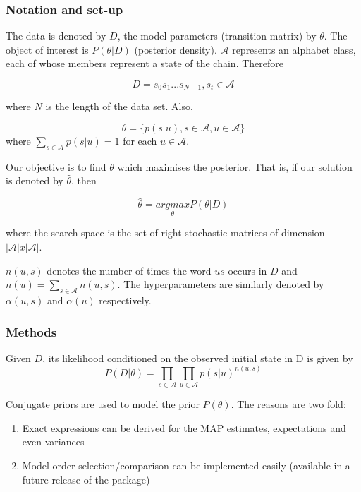 \documentclass[article,nojss]{jss}
\providecommand{\tightlist}{%
  \setlength{\itemsep}{0pt}\setlength{\parskip}{0pt}}
\begin{document}
\hypertarget{notation-and-set-up}{%
\subsubsection{Notation and set-up}\label{notation-and-set-up}}

The data is denoted by \(D\), the model parameters (transition matrix) by \(\theta\). The object of interest is \(P(\theta | D)\) (posterior density). \(\mathcal{A}\) represents an alphabet class, each of whose members represent a state of the chain. Therefore

\[D = s_0 s_1 ... s_{N-1}, s_t \in \mathcal{A}\]

where \(N\) is the length of the data set. Also,

\[\theta = \{p(s|u), s \in \mathcal{A}, u \in \mathcal{A}  \}\]
where \(\sum_{s \in \mathcal{A}} p(s|u) = 1\) for each \(u \in \mathcal{A}\).

Our objective is to find \(\theta\) which maximises the posterior. That is, if our solution is denoted by \(\hat{\theta}\), then

\[\hat{\theta} = \underset{\theta}{argmax}P(\theta | D)\]

where the search space is the set of right stochastic matrices of dimension \(|\mathcal{A}|x|\mathcal{A}|\).

\(n(u, s)\) denotes the number of times the word \(us\) occurs in \(D\) and \(n(u)=\sum_{s \in \mathcal{A}}n(u, s)\). The hyperparameters are similarly denoted by \(\alpha(u, s)\) and \(\alpha(u)\) respectively.

\hypertarget{methods}{%
\subsubsection{Methods}\label{methods}}

Given \(D\), its likelihood conditioned on the observed initial state in D is given by
\[P(D|\theta) = \prod_{s \in \mathcal{A}} \prod_{u \in \mathcal{A}} p(s|u)^{n(u, s)}\]

Conjugate priors are used to model the prior \(P(\theta)\). The reasons are two fold:

\begin{enumerate}
\def\labelenumi{\arabic{enumi}.}
\tightlist
\item
  Exact expressions can be derived for the MAP estimates, expectations and even variances
\item
  Model order selection/comparison can be implemented easily (available in a future release of the package)
\end{enumerate}
\end{document}
